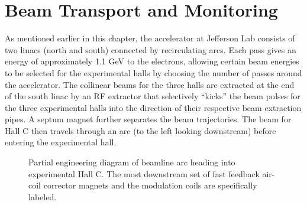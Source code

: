 \section{Beam Transport and Monitoring}
\label{sctn:btandm}
As mentioned earlier in this chapter, the accelerator at Jefferson Lab consists of two linacs (north and south) connected by recirculating arcs. Each pass gives an energy of approximately 1.1 GeV to the electrons, allowing certain beam energies to be selected for the experimental halls by choosing the number of passes around the accelerator. The collinear beams for the three halls are extracted at the end of the south linac by an RF extractor that selectively ``kicks'' the beam pulses for the three experimental halls into the direction of their respective beam extraction pipes. A septum magnet further separates the beam trajectories. The beam for Hall C then travels through an arc (to the left looking downstream) before entering the experimental hall. 
\begin{figure}[ht]
\centering
{}
\caption{Partial engineering diagram of beamline arc heading into experimental Hall C. The most downstream set of fast feedback air-coil corrector magnets and the modulation coils are specifically labeled.}
\label{fig:HallC_arc}
\end{figure}

